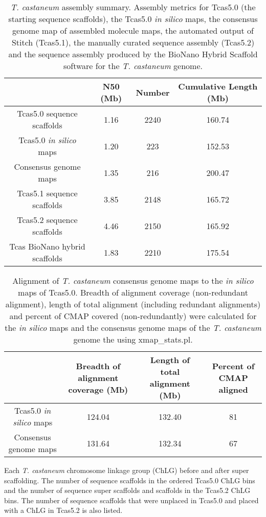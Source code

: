 \documentclass{bmcart}
\begin{document}
\begin{backmatter}
\begin{table}[h!]
	\caption{\textit{T. castaneum} assembly summary. Assembly metrics for Tcas5.0 (the starting sequence scaffolds), the Tcas5.0  \textit{in silico} maps, the consensus genome map of assembled molecule maps, the automated output of Stitch (Tcas5.1), the manually curated sequence assembly (Tcas5.2) and the sequence assembly produced by the BioNano Hybrid Scaffold software for the \textit{T. castaneum} genome.}
	\begin{tabular}{cccc}
		\hline
		& N50 (Mb)  & Number & Cumulative Length (Mb)\\ \hline
		Tcas5.0 sequence scaffolds & 1.16 & 2240 & 160.74\\
		Tcas5.0 \textit{in silico} maps & 1.20 &  223 & 152.53\\
		Consensus genome maps & 1.35 &  216 & 200.47\\
		Tcas5.1 sequence scaffolds & 3.85 & 2148 & 165.72\\
		Tcas5.2 sequence scaffolds & 4.46 & 2150 & 165.92\\ 
		Tcas BioNano hybrid scaffolds & 1.83 & 2210 &175.54 \\ \hline
	\end{tabular}
\end{table}
\begin{table}[h!]
\caption{Alignment of \textit{T. castaneum} consensus genome maps to the \textit{in silico} maps of Tcas5.0. Breadth of alignment coverage (non-redundant alignment), length of total alignment (including redundant alignments) and percent of CMAP covered (non-redundantly) were calculated for the \textit{in silico} maps and the consensus genome maps of the \textit{T. castaneum} genome the using xmap\_stats.pl.}
      \begin{tabular}{cccc}
        \hline
           & Breadth of alignment coverage (Mb) & Length of total alignment (Mb) & Percent of CMAP aligned \\ \hline
        Tcas5.0 \textit{in silico} maps & 124.04 & 132.40 & 81 \\
        Consensus genome maps & 131.64 & 132.34 & 67 \\ \hline
      \end{tabular}
\end{table}
\begin{table}[h!]
	\caption{Each \textit{T. castaneum} chromosome linkage group (ChLG) before and after super scaffolding. The number of sequence scaffolds in the ordered Tcas5.0 ChLG bins and the number of sequence super scaffolds and scaffolds in the Tcas5.2 ChLG bins. The number of sequence scaffolds that were unplaced in Tcas5.0 and placed with a ChLG in Tcas5.2 is also listed. }

\end{table}
\end{backmatter}
\end{document}
